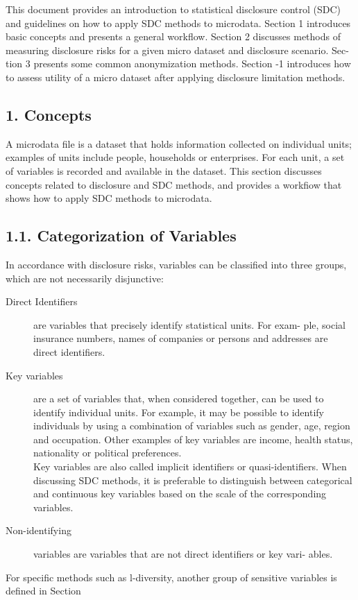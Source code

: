 \documentclass[]{article}
\title{}
\author{}
\begin{document}
This document provides an introduction to statistical disclosure control (SDC)
and guidelines on how to apply SDC methods to microdata. Section 1 introduces
basic concepts and presents a general workﬂow. Section 2 discusses methods of
measuring disclosure risks for a given micro dataset and disclosure scenario. Sec-
tion 3 presents some common anonymization methods. Section -1 introduces how
to assess utility of a micro dataset after applying disclosure limitation methods.
\subsection*{1. Concepts}
A microdata ﬁle is a dataset that holds information collected on individual units;
examples of units include people, households or enterprises. For each unit, a set of
variables is recorded and available in the dataset. This section discusses concepts
related to disclosure and SDC methods, and provides a workﬁow that shows how
to apply SDC methods to microdata.

\subsection*{1.1. Categorization of Variables}
In accordance with disclosure risks, variables can be classiﬁed into three groups,
which are not necessarily disjunctive:
\begin{description}
\item[Direct Identifiers] are variables that precisely identify statistical units. For exam-
ple, social insurance numbers, names of companies or persons and addresses
are direct identiﬁers.
\end{description}

\begin{description}
\item[Key variables] are a set of variables that, when considered together, can be used
to identify individual units. For example, it may be possible to identify
individuals by using a combination of variables such as gender, age, region
and occupation. Other examples of key variables are income, health status,
nationality or political preferences. \\

Key variables are also called implicit
identiﬁers or quasi-identifiers. When discussing SDC methods, it is preferable
to distinguish between categorical and continuous key variables based on the
scale of the corresponding variables.
\item[Non-identifying] variables are variables that are not direct identiﬁers or key vari-
ables.
\end{description}
\newpage
For speciﬁc methods such as l-diversity, another group of sensitive variables is
deﬁned in Section 
\newpage
\end{document}
